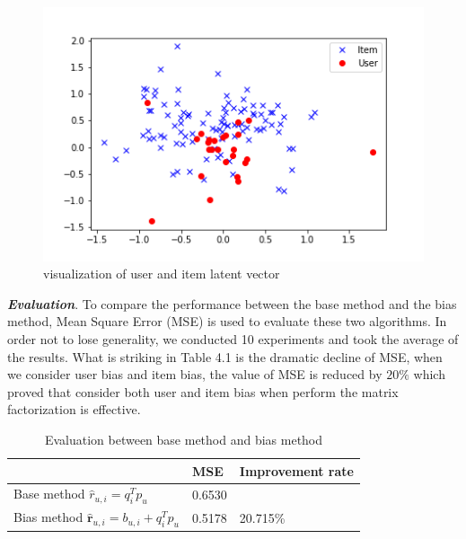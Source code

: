 \begin{figure}[htbp]
\centering
\includegraphics[scale =0.8]{figure/f6.png}
\caption{visualization of user and item latent vector}
\end{figure}

\textbf{\textit{Evaluation}}. To compare the performance between the base method and the bias method, Mean Square Error (MSE) is used to evaluate these two algorithms. In order not to lose generality, we conducted 10 experiments and took the average of the results. What is striking in Table 4.1 is the dramatic decline of MSE, when we consider user bias and item bias, the value of MSE is reduced by $20\%$ which proved that consider both user and item bias when
perform the matrix factorization is effective.


\begin{table}[htbp]
\centering
\begin{tabular}{lll}
\hline
            &\textbf{MSE}    & \textbf{Improvement rate} \\ \hline
Base method  $\hat{r}_{u,i}=q_{i}^{T}p_{u}$ & 0.6530 &                  \\
Bias method $\hat{\boldsymbol{r}}_{u,i}=b_{u,i}+q_{i}^{T} p_{u}$ & 0.5178 & 20.715\%        
\end{tabular}
\caption{Evaluation between base method and bias method}
\end{table}
